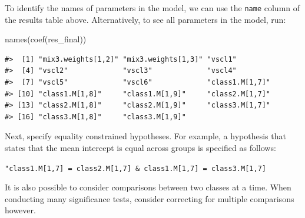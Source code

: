 \documentclass[
  man,floatsintext]{apa6}
\newenvironment{Shaded}{\begin{snugshade}}{\end{snugshade}}
\newcommand{\AttributeTok}[1]{\textcolor[rgb]{0.77,0.63,0.00}{#1}}
\newcommand{\CommentTok}[1]{\textcolor[rgb]{0.56,0.35,0.01}{\textit{#1}}}
\newcommand{\DecValTok}[1]{\textcolor[rgb]{0.00,0.00,0.81}{#1}}
\newcommand{\FunctionTok}[1]{\textcolor[rgb]{0.00,0.00,0.00}{#1}}
\newcommand{\NormalTok}[1]{#1}
\newcommand{\OtherTok}[1]{\textcolor[rgb]{0.56,0.35,0.01}{#1}}
\newcommand{\SpecialCharTok}[1]{\textcolor[rgb]{0.00,0.00,0.00}{#1}}
\newcommand{\StringTok}[1]{\textcolor[rgb]{0.31,0.60,0.02}{#1}}
\begin{document}
To identify the names of parameters in the model, we can use the \texttt{name}
column of the results table above. Alternatively, to see all parameters
in the model, run:

\begin{Shaded}
\begin{Highlighting}[]
\FunctionTok{names}\NormalTok{(}\FunctionTok{coef}\NormalTok{(res\_final))}
\end{Highlighting}
\end{Shaded}

\begin{verbatim}
#>  [1] "mix3.weights[1,2]" "mix3.weights[1,3]" "vscl1"            
#>  [4] "vscl2"             "vscl3"             "vscl4"            
#>  [7] "vscl5"             "vscl6"             "class1.M[1,7]"    
#> [10] "class1.M[1,8]"     "class1.M[1,9]"     "class2.M[1,7]"    
#> [13] "class2.M[1,8]"     "class2.M[1,9]"     "class3.M[1,7]"    
#> [16] "class3.M[1,8]"     "class3.M[1,9]"
\end{verbatim}

Next, specify equality constrained hypotheses. For example, a hypothesis
that states that the mean intercept is equal across groups is specified
as follows:

\texttt{"class1.M{[}1,7{]}\ =\ class2.M{[}1,7{]}\ \&\ class1.M{[}1,7{]}\ =\ class3.M{[}1,7{]}}

It is also possible to consider comparisons between two classes at a
time. When conducting many significance tests, consider correcting for
multiple comparisons however.

\begin{Shaded}
\end{Shaded}
\end{document}
